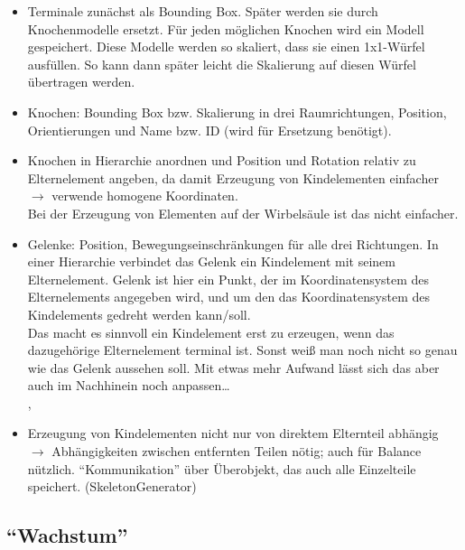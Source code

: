 \begin{itemize}
 \item Terminale zunächst als Bounding Box. Später werden sie durch Knochenmodelle ersetzt. Für jeden möglichen Knochen wird ein Modell gespeichert. Diese Modelle werden so skaliert, dass sie einen 1x1-Würfel ausfüllen. So kann dann später leicht die Skalierung auf diesen Würfel übertragen werden.
 
 \item Knochen: Bounding Box bzw. Skalierung in drei Raumrichtungen, Position, Orientierungen und Name bzw. ID (wird für Ersetzung benötigt).
 
 \item Knochen in Hierarchie anordnen und Position und Rotation relativ zu Elternelement angeben, da damit Erzeugung von Kindelementen einfacher $\rightarrow$ verwende homogene Koordinaten.\\
 Bei der Erzeugung von Elementen auf der Wirbelsäule ist das nicht einfacher.  %
 
 \item Gelenke: Position, Bewegungseinschränkungen für alle drei Richtungen. In einer Hierarchie verbindet das Gelenk ein Kindelement mit seinem Elternelement. Gelenk ist hier ein Punkt, der im Koordinatensystem des Elternelements angegeben wird, und um den das Koordinatensystem des Kindelements gedreht werden kann/soll.\\
 Das macht es sinnvoll ein Kindelement erst zu erzeugen, wenn das dazugehörige Elternelement terminal ist. Sonst weiß man noch nicht so genau wie das Gelenk aussehen soll. Mit etwas mehr Aufwand lässt sich das aber auch im Nachhinein noch anpassen\dots\\
 , %
 
 \item Erzeugung von Kindelementen nicht nur von direktem Elternteil abhängig $\rightarrow$ Abhängigkeiten zwischen entfernten Teilen nötig; auch für Balance nützlich. "`Kommunikation"' über Überobjekt, das auch alle Einzelteile speichert. (SkeletonGenerator)
 \end{itemize}
 
\subsection{"`Wachstum"'}
 
